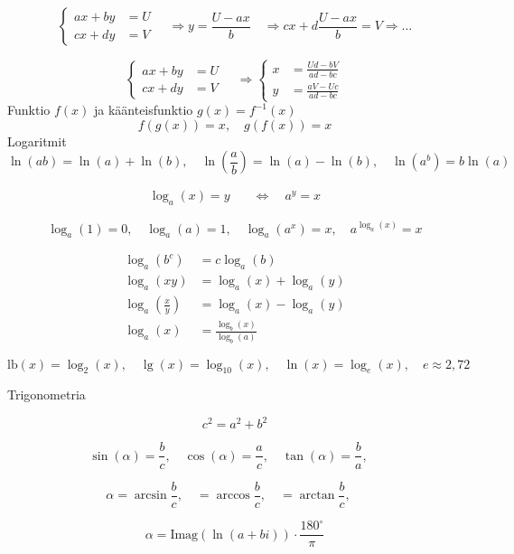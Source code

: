 \documentclass[12pt]{article}
\begin{document}
$$
\begin{cases}
ax+by&=U\\
cx+dy&=V
\end{cases}\quad\Rightarrow
y=\frac{U-ax}{b}\quad\Rightarrow
cx+d\frac{U-ax}{b}=V\Rightarrow\ldots
$$

$$
\begin{cases}
ax+by&=U\\
cx+dy&=V
\end{cases}\quad\Rightarrow
\begin{cases}
x&=\frac{Ud-bV}{ad-bc}\\
y&=\frac{aV-Uc}{ad-bc}
\end{cases}
$$
Funktio $f(x)$ ja käänteisfunktio $g(x)=f^{-1}(x)$
$$
f(g(x))=x,\quad
g(f(x))=x
$$
Logaritmit
$$
\ln(ab)=\ln(a)+\ln(b),\quad
\ln(\frac{a}{b})=\ln(a)-\ln(b),\quad
\ln(a^b)=b\ln(a)
$$


\begin{equation*}
\begin{split}
\log_a(x)=y\quad&\Leftrightarrow\quad a^y=x
\end{split}
\end{equation*}


$$
\log_a(1)=0,\quad
\log_a(a)=1,\quad
\log_a(a^x)=x,\quad
a^{\log_a(x)}=x
$$

\begin{equation*}
\begin{split}
\log_a(b^c)&=c\log_a(b)\\
\log_a(xy)&=\log_a(x)+\log_a(y)\\
\log_a\left(\frac{x}{y}\right)
&=\log_a(x)-\log_a(y)\\
\log_a(x)&=\frac{\log_b(x)}{\log_b(a)}
\end{split}
\end{equation*}

$$
\textrm{lb}(x)=\log_2(x),\quad
\lg(x)=\log_{10}(x),\quad
\ln(x)=\log_e(x),\quad
e\approx 2,72
$$

Trigonometria


$$
c^2=a^2+b^2
$$

$$
\sin(\alpha)=\frac{b}{c},\quad
\cos(\alpha)=\frac{a}{c},\quad
\tan(\alpha)=\frac{b}{a},\quad
$$

$$
\alpha=\arcsin\frac{b}{c},\quad
=\arccos\frac{b}{c},\quad
=\arctan\frac{b}{c},\quad
$$

$$
\alpha=\textrm{Imag}(\ln(a+bi))\cdot\frac{180^\circ}{\pi}
$$
\end{document}
